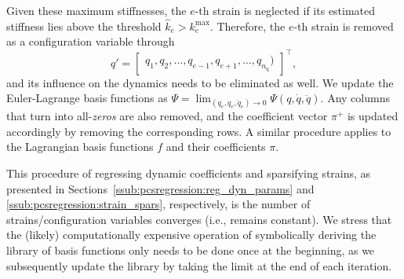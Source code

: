 Given these maximum stiffnesses, the $e$-th strain is neglected if its estimated stiffness lies above the threshold $\hat{k}_e>k_e^{\mathrm{max}}$. Therefore, the $e$-th strain is removed as a configuration variable through
\begin{equation}
    q' = \begin{bmatrix}
        q_1, q_2, \ldots, q_{e-1}, q_{e+1}, \ldots, q_{n_\mathrm{q}})
    \end{bmatrix}^\top,
\end{equation}
and its influence on the dynamics needs to be eliminated as well. We update the Euler-Lagrange basis functions as $\Psi = \lim_{(q_e,\dot{q}_e,\ddot{q}_e)\to 0} \Psi (q, \dot{q}, \ddot{q})$. Any columns that turn into all-\emph{zeros} are also removed, and the coefficient vector $\pi^+$ is updated accordingly by removing the corresponding rows. A similar procedure applies to the Lagrangian basis functions $f$ and their coefficients $\pi$.


This procedure of regressing dynamic coefficients and sparsifying strains, as presented in Sections~\ref{ssub:pcsregression:reg_dyn_params} and \ref{ssub:pcsregression:strain_spars}, respectively, is the number of strains/configuration variables converges (i.e., remains constant). We stress that the (likely) computationally expensive operation of symbolically deriving the library of basis functions only needs to be done once at the beginning, as we subsequently update the library by taking the limit at the end of each iteration.

